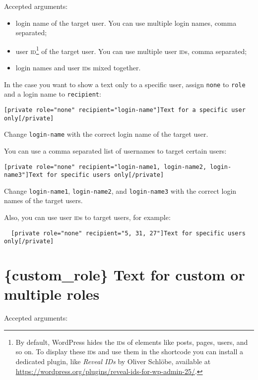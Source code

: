 Accepted arguments:

\begin{itemize}
  \item login name of the target user. You can use multiple login names, comma
  separated;
  \item user \textsc{id}\footnote{By default, WordPress hides the \textsc{id}s
  of elements like posts, pages, users, and so on. To display these \textsc{id}s
  and use them in the shortcode you can install a dedicated plugin, like
  \textit{Reveal IDs} by Oliver Schlöbe, available at
  \url{https://wordpress.org/plugins/reveal-ids-for-wp-admin-25/}.} of the
  target user. You can use multiple user \textsc{id}s, comma separated;
  \item login names and user \textsc{id}s mixed together.
\end{itemize}

In the case you want to show a text only to a specific user, assign \verb+none+
to \verb+role+ and a login name to \verb+recipient+:

\begin{lstlisting}
[private role="none" recipient="login-name"]Text for a specific user only[/private]
\end{lstlisting}

Change \verb+login-name+ with the correct login name of the target user.

You can use a comma separated list of usernames to target certain users:

\begin{lstlisting}
[private role="none" recipient="login-name1, login-name2, login-name3"]Text for specific users only[/private]
\end{lstlisting}

Change \verb+login-name1+, \verb+login-name2+, and \verb+login-name3+ with the
correct login names of the target users.

Also, you can use user \textsc{id}s to target users, for example:

\begin{lstlisting}
  [private role="none" recipient="5, 31, 27"]Text for specific users only[/private]
\end{lstlisting}

\section{\{custom\_role\} Text for custom or multiple roles}

Accepted arguments:

